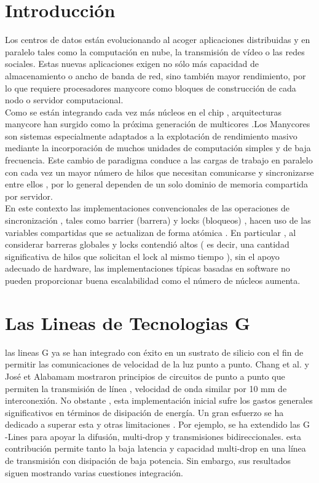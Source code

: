 \documentclass[conference]{IEEEtran}
\begin{document}
\section{Introducción}
Los centros de datos están evolucionando al acoger aplicaciones distribuidas y en paralelo
tales como la computación en nube, la transmisión de vídeo o las redes sociales. Estas nuevas aplicaciones
exigen no sólo más capacidad de almacenamiento o ancho de banda de red, sino también mayor
rendimiento, por lo que requiere procesadores manycore como bloques de construcción
de cada nodo o servidor computacional.\\
Como se están integrando cada vez más núcleos en el chip , arquitecturas manycore han surgido como la próxima generación de multicores .Los Manycores son sistemas especialmente adaptados a la explotación de rendimiento masivo mediante la incorporación de muchos
unidades de computación simples y de baja frecuencia. Este cambio de paradigma conduce a las cargas de trabajo en paralelo con cada vez un mayor número de hilos que necesitan comunicarse y sincronizarse entre ellos , por lo general dependen de un solo
dominio de memoria compartida por servidor.\\
En este contexto las implementaciones convencionales de las operaciones de sincronización , tales
como barrier (barrera) y locks (bloqueos) , hacen uso de las variables compartidas que se actualizan de forma atómica .
En particular , al considerar barreras globales y locks contendió altos ( es decir, una
cantidad significativa de hilos que solicitan el lock al mismo tiempo ), sin el apoyo adecuado de hardware, las implementaciones típicas basadas en software no pueden proporcionar buena escalabilidad como el número de núcleos aumenta.

\section{Las Lineas de Tecnologias G}
	las lineas G ya se han integrado con éxito en un sustrato de silicio con el fin de
permitir las comunicaciones de velocidad de la luz punto a punto. Chang et al.  y José et
Alabamam mostraron principios de circuitos de punto a punto que permiten la transmisión de línea , velocidad de onda similar
por 10 mm de interconexión. No obstante , esta implementación inicial sufre
los gastos generales significativos en términos de disipación de energía. Un gran esfuerzo
se ha dedicado a superar esta y otras limitaciones . Por ejemplo, se ha extendido las 
G -Lines para apoyar la difusión, multi-drop y transmisiones bidireccionales. esta contribución
permite tanto la baja latencia y capacidad multi-drop en una línea de transmisión con
disipación de baja potencia. Sin embargo, sus resultados siguen mostrando varias cuestiones integración.
\end{document}
